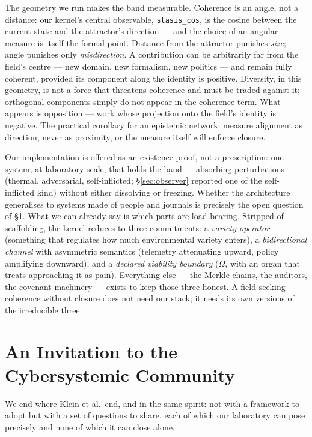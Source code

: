 \documentclass[12pt]{article}
\begin{document}
The geometry we run makes the band measurable. Coherence is an angle, not a
distance: our kernel's central observable, \texttt{stasis\_cos}, is the cosine
between the current state and the attractor's direction --- and the choice of
an angular measure is itself the formal point. Distance from the attractor
punishes \emph{size}; angle punishes only \emph{misdirection}. A contribution
can be arbitrarily far from the field's centre --- new domain, new formalism,
new politics --- and remain fully coherent, provided its component along the
identity is positive. Diversity, in this geometry, is not a force that
threatens coherence and must be traded against it; orthogonal components
simply do not appear in the coherence term. What appears is opposition ---
work whose projection onto the field's identity is negative. The practical
corollary for an epistemic network: measure alignment as direction, never as
proximity, or the measure itself will enforce closure.

Our implementation is offered as an existence proof, not a prescription: one
system, at laboratory scale, that holds the band --- absorbing perturbations
(thermal, adversarial, self-inflicted; \S\ref{sec:observer} reported one of
the self-inflicted kind) without either dissolving or freezing. Whether the
architecture generalises to systems made of people and journals is precisely
the open question of \S\ref{sec:invitation}. What we can already say is
which parts are load-bearing. Stripped of scaffolding, the kernel reduces to
three commitments: a \emph{variety operator} (something that regulates how
much environmental variety enters), a \emph{bidirectional channel} with
asymmetric semantics (telemetry attenuating upward, policy amplifying
downward), and a \emph{declared viability boundary} ($\Omega$, with an organ
that treats approaching it as pain). Everything else --- the Merkle chains,
the auditors, the covenant machinery --- exists to keep those three honest.
A field seeking coherence without closure does not need our stack; it needs
its own versions of the irreducible three.

\section{An Invitation to the Cybersystemic Community}
\label{sec:invitation}


We end where Klein et al.\ end, and in the same spirit: not with a framework
to adopt but with a set of questions to share, each of which our laboratory can
pose precisely and none of which it can close alone.
\end{document}
